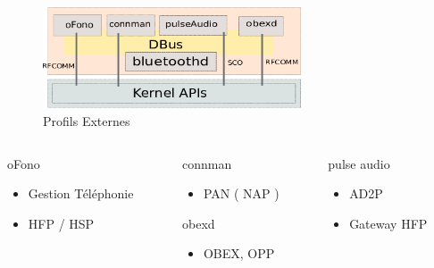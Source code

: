 \begin{frame}
	\begin{figure}
		\includegraphics[height=3cm]{profiles_externes.png}
		\caption{Profils Externes}
	\end{figure}
	\begin{center}
\begin{columns}[t]
	\begin{column}{0.30\linewidth}
		\begin{block}{oFono}
			\begin{itemize}
				\item Gestion Téléphonie
				\item HFP / HSP
			\end{itemize}
		\end{block}
	\end{column}
	\begin{column}{0.30\linewidth}
		\begin{block}{connman}
			\begin{itemize}
				\item PAN ( NAP )
			\end{itemize}
		\end{block}
		\begin{block}{obexd}
			\begin{itemize}
				\item OBEX, OPP
			\end{itemize}
		\end{block}
	\end{column}
	\begin{column}{0.30\linewidth}
		\begin{block}{pulse audio}
			\begin{itemize}
				\item AD2P
				\item Gateway HFP
			\end{itemize}
		\end{block}
	\end{column}
\end{columns}
\end{center}
\end{frame}

